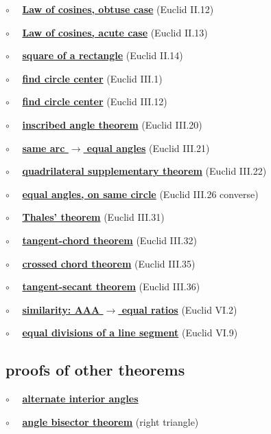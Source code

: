 \documentclass[11pt, oneside]{article}
\begin{document}
$\circ$ \ \ \hyperref[sec:law_of_cosines]{\textbf{Law of cosines, obtuse case}} (Euclid II.12)

$\circ$ \ \ \hyperref[sec:law_of_cosines]{\textbf{Law of cosines, acute case}} (Euclid II.13)

$\circ$ \ \ \hyperref[sec:Euclid_II_14]{\textbf{square of a rectangle}} (Euclid II.14)

$\circ$ \ \ \hyperref[sec:find_circle_center]{\textbf{find circle center}} (Euclid III.1)

$\circ$ \ \ \hyperref[sec:Euclid_III_12]{\textbf{find circle center}} (Euclid III.12)

$\circ$ \ \ \hyperref[sec:inscribed_angle_theorem]{\textbf{inscribed angle theorem}} (Euclid III.20)

$\circ$ \ \ \hyperref[sec:angles_on_same_arc]{\textbf{same arc $\rightarrow$ equal angles}} (Euclid III.21)

$\circ$ \ \ \hyperref[sec:quadrilateral_supplementary]{\textbf{quadrilateral supplementary theorem}} (Euclid III.22)

$\circ$ \ \ \hyperref[sec:equal_angle_on_circle_contradiction]{\textbf{equal angles, on same circle}} (Euclid III.26 converse)

$\circ$ \ \ \hyperref[sec:Thales_theorem]{\textbf{Thales' theorem}} (Euclid III.31)

$\circ$ \ \ \hyperref[sec:tangent_chord_theorem]{\textbf{tangent-chord theorem}} (Euclid III.32)

$\circ$ \ \ \hyperref[sec:Euclid_III_35]{\textbf{crossed chord theorem}} (Euclid III.35)

$\circ$ \ \ \hyperref[sec:secant_tangent_theorem]{\textbf{tangent-secant theorem}} (Euclid III.36)

$\circ$ \ \ \hyperref[sec:Euclid_VI_2]{\textbf{similarity:  AAA $\rightarrow$ equal ratios}} (Euclid VI.2)

$\circ$ \ \ \hyperref[sec:Euclid_VI_9]{\textbf{equal divisions of a line segment}} (Euclid VI.9)


\subsection*{proofs of other theorems}

$\circ$ \ \  \hyperref[sec:alternate_interior_angle_theorem]{\textbf{alternate interior angles}}

$\circ$ \ \ \hyperref[sec:angle_bisector_theorem]{\textbf{angle bisector theorem}} (right triangle)
\end{document}
